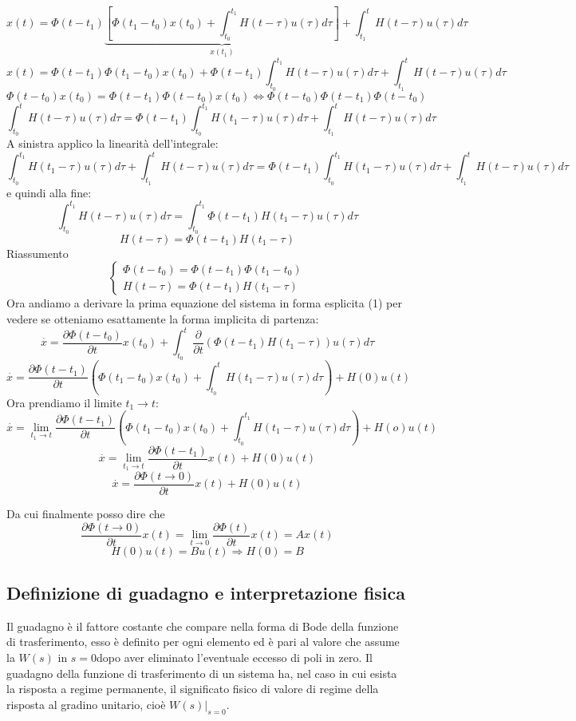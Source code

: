 \documentclass{article}
\begin{document}
\[ x(t) = \Phi(t-t_1)\underbrace{\left[ \Phi(t_1-t_0)x(t_0)+\int_{t_0}^{t_1} H(t-\tau)u(\tau)d\tau\right]}_{x(t_1)}+\int_{t_1}^{t} H(t-\tau)u(\tau)d\tau \]
\[x(t) = \Phi(t-t_1)\Phi(t_1-t_0)x(t_0)+\Phi(t-t_1)\int_{t_0}^{t_1} H(t-\tau)u(\tau)d\tau+\int_{t_1}^{t} H(t-\tau)u(\tau)d\tau\]
\[ \Phi(t-t_0)x(t_0)= \Phi(t-t_1)\Phi(t-t_0)x(t_0)\Longleftrightarrow\Phi(t-t_0)\Phi(t-t_1)\Phi(t-t_0) \]
\[ \int_{t_0}^{t} H(t-\tau)u(\tau)d\tau = \Phi(t-t_1)\int_{t_0}^{t_1} H(t_1-\tau)u(\tau)d\tau+\int_{t_1}^{t} H(t-\tau)u(\tau)d\tau \] 
A sinistra applico la linearità dell'integrale:
\[ \int_{t_0}^{t_1} H(t_1-\tau)u(\tau)d\tau+\int_{t_1}^{t} H(t-\tau)u(\tau)d\tau
 = \Phi(t-t_1)\int_{t_0}^{t_1} H(t_1-\tau)u(\tau)d\tau+\int_{t_1}^{t} H(t-\tau)u(\tau)d\tau \]
e quindi alla fine:
\[ \int_{t_0}^{t_1} H(t-\tau)u(\tau)d\tau = \int_{t_0}^{t_1}\Phi(t-t_1) H(t_1-\tau)u(\tau)d\tau \]
\[ H(t-\tau) = \Phi(t-t_1) H(t_1-\tau) \]
Riassumento
\[\begin{cases} 
        \Phi(t-t_0) = \Phi(t-t_1)\Phi(t_1-t_0)\\
        H(t-\tau) = \Phi(t-t_1) H(t_1-\tau)
\end{cases}
\]
Ora andiamo a derivare la prima equazione del sistema in forma esplicita (1) per vedere se otteniamo
esattamente la forma implicita di partenza:
\[ \overset{\cdot}{x} = \frac{\partial \Phi(t-t_0)}{\partial t}x(t_0)+\int_{t_0}^{t} \frac{\partial}{\partial t}\left( \Phi(t-t_1) H(t_1-\tau)\right)u(\tau)d\tau \]
\[ \overset{\cdot}{x} = \frac{\partial \Phi(t-t_1)}{\partial t}\left(\Phi(t_1-t_0)x(t_0)+\int_{t_0}^{t}H(t_1-\tau)u(\tau)d\tau\right)+H(0)u(t) \]
Ora prendiamo il limite $t_1\to t$:
\[ \overset{\cdot}{x} = \lim_{t_1\to t}\frac{\partial \Phi(t-t_1)}{\partial t}\left(\Phi(t_1-t_0)x(t_0)+\int_{t_0}^{t_1}H(t_1-\tau)u(\tau)d\tau\right)+H(o)u(t) \]
\[ \overset{\cdot}{x} = \lim_{t_1\to t}\frac{\partial \Phi(t-t_1)}{\partial t}x(t)+H(0)u(t) \]
\[ \overset{\cdot}{x} = \frac{\partial \Phi(t\to0)}{\partial t}x(t)+H(0)u(t) \]

Da cui finalmente posso dire che 
\[ \frac{\partial \Phi(t\to 0)}{\partial t}x(t) =\lim_{t\to 0}\frac{\partial \Phi(t)}{\partial t}x(t) = Ax(t) \]
\[ H(0)u(t) = Bu(t) \Rightarrow H(0) = B \]















\subsection{Definizione di guadagno e interpretazione fisica}
Il guadagno è il fattore costante che compare nella forma di Bode della funzione di trasferimento,
esso è definito per ogni elemento ed è pari al valore che assume la $W(s)$
in $s=0 $dopo aver eliminato l'eventuale eccesso di poli in zero.
Il guadagno della funzione di trasferimento di un sistema ha,
nel caso in cui esista la risposta a regime permanente,
il significato fisico di valore di regime della risposta al gradino unitario,
cioè $W(s)|_{s=0}$.
\end{document}
